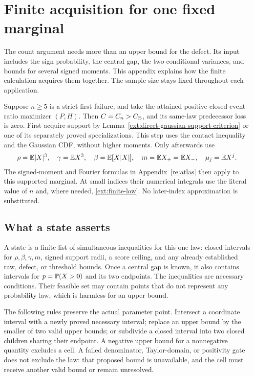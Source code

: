 \section{Finite acquisition for one fixed marginal}
\label{ext:finite-acquisition}
The count argument needs more than an upper bound for the defect. Its
input includes the sign probability, the central gap, the two conditional
variances, and bounds for several signed moments. This appendix explains
how the finite calculation acquires them together. The sample size stays
fixed throughout each application.

Suppose $n\ge5$ is a strict first failure, and take the attained positive
closed-event ratio maximizer $(P,H)$. Then $C=C_n>C_{\mathrm E}$, and its same-law
predecessor loss is zero. First acquire support by
Lemma~\ref{ext:direct-gaussian-support-criterion} or one of its separately
proved specializations. This step uses the contact inequality and the
Gaussian CDF, without higher moments. Only afterwards use
\[
 \rho=\mathbb E|X|^3,\quad \gamma=\mathbb E X^3,\quad
 \beta=\mathbb E[X|X|],\quad m=\mathbb E X_+=\mathbb E X_-,\quad \mu_j=\mathbb E X^j.
\]
The signed-moment and Fourier formulas in Appendix~\ref{re:atlas} then
apply to this supported marginal. At small indices their numerical
integrals use the literal value of $n$ and, where needed,
\eqref{ext:finite-low}. No later-index approximation is substituted.

\subsection{What a state asserts}
A state is a finite list of simultaneous inequalities for this one law:
closed intervals for $\rho,\beta,\gamma,m$, signed support radii, a
score ceiling, and any already established raw, defect, or threshold
bounds. Once a central gap is known, it also contains intervals for
$p=\mathbb P(X>0)$ and its two endpoints. The inequalities are necessary
conditions. Their feasible set may contain points that do not represent
any probability law, which is harmless for an upper bound.

The following rules preserve the actual parameter point. Intersect a
coordinate interval with a newly proved necessary interval; replace an
upper bound by the smaller of two valid upper bounds; or subdivide a
closed interval into two closed children sharing their endpoint.
A negative upper bound for a nonnegative quantity excludes a cell.
A failed denominator, Taylor-domain, or positivity gate does not exclude
the law: that proposed bound is unavailable, and the cell must receive
another valid bound or remain unresolved.

